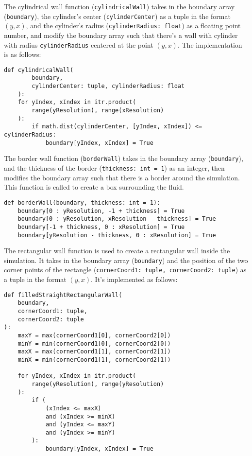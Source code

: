 The cylindrical wall function (\texttt{cylindricalWall}) takes in the boundary array (\texttt{boundary}), the cylinder's center (\texttt{cylinderCenter}) as a tuple in the format $(y, x)$, and the cylinder's radius (\texttt{cylinderRadius: float}) as a floating point number, and modify the boundary array such that there's a wall with cylinder with radius \texttt{cylinderRadius} centered at the point $(y, x)$. The implementation is as follows:
\begin{verbatim}
def cylindricalWall(
        boundary,
        cylinderCenter: tuple, cylinderRadius: float
    ):
    for yIndex, xIndex in itr.product(
        range(yResolution), range(xResolution)
    ):
        if math.dist(cylinderCenter, [yIndex, xIndex]) <= cylinderRadius:
            boundary[yIndex, xIndex] = True
\end{verbatim}
The border wall function (\texttt{borderWall}) takes in the boundary array (\texttt{boundary}), and the thickness of the border (\texttt{thickness: int = 1}) as an integer, then modifies the boundary array such that there is a border around the simulation. This function is called to create a box surrounding the fluid.
\begin{verbatim}
def borderWall(boundary, thickness: int = 1):
    boundary[0 : yResolution, -1 + thickness] = True
    boundary[0 : yResolution, xResolution - thickness] = True
    boundary[-1 + thickness, 0 : xResolution] = True
    boundary[yResolution - thickness, 0 : xResolution] = True
\end{verbatim}

The rectangular wall function is used to create a rectangular wall inside the simulation. It takes in the boundary array (\texttt{boundary}) and the position of the two corner points of the rectangle (\texttt{cornerCoord1: tuple, cornerCoord2: tuple}) as a tuple in the format $(y, x)$. It's implemented as follows:
\begin{verbatim}
def filledStraightRectangularWall(
    boundary,
    cornerCoord1: tuple,
    cornerCoord2: tuple
):
    maxY = max(cornerCoord1[0], cornerCoord2[0])
    minY = min(cornerCoord1[0], cornerCoord2[0])
    maxX = max(cornerCoord1[1], cornerCoord2[1])
    minX = min(cornerCoord1[1], cornerCoord2[1])

    for yIndex, xIndex in itr.product(
        range(yResolution), range(yResolution)
    ):
        if (
            (xIndex <= maxX)
            and (xIndex >= minX)
            and (yIndex <= maxY)
            and (yIndex >= minY)
        ):
            boundary[yIndex, xIndex] = True
\end{verbatim}

